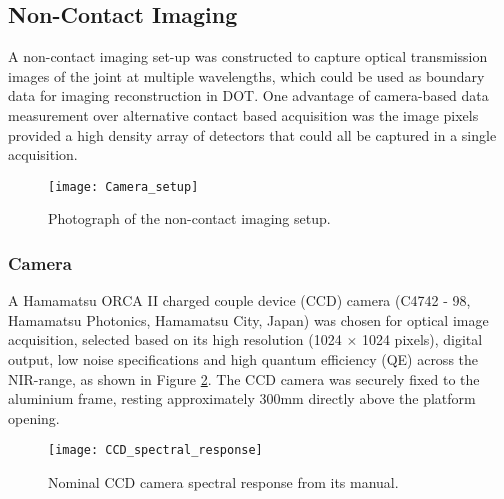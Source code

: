 \documentclass[twoside]{bhamthesis}
\theoremstyle{definition}
\begin{document}

\subsection{Non-Contact Imaging}

A non-contact imaging set-up was constructed to capture optical transmission images of the joint at multiple wavelengths, which could be used as boundary data for imaging reconstruction in DOT. One advantage of camera-based data measurement over alternative contact based acquisition was the image pixels provided a high density array of detectors that could all be captured in a single acquisition.

\begin{figure}[!ht]
\centering
  \centering
  \texttt{[image: Camera\_setup]}
	\caption{Photograph of the non-contact imaging setup.}
  \label{fig:Camera_setup}
\end{figure}

\subsubsection{Camera}

A Hamamatsu ORCA II charged couple device (CCD) camera (C4742 - 98, Hamamatsu Photonics, Hamamatsu City, Japan) was chosen for optical image acquisition, selected based on its high resolution (1024 $\times$ 1024 pixels), digital output, low noise specifications and high quantum efficiency (QE) across the NIR-range, as shown in Figure \ref{fig:CCD_spectral_response}. The CCD camera was securely fixed to the aluminium frame, resting approximately 300mm directly above the platform opening.

\begin{figure}[!ht]
\centering
  \centering
  \texttt{[image: CCD\_spectral\_response]}
	\caption{Nominal CCD camera spectral response from its  manual.}
  \label{fig:CCD_spectral_response}
\end{figure}
 
\end{document}
